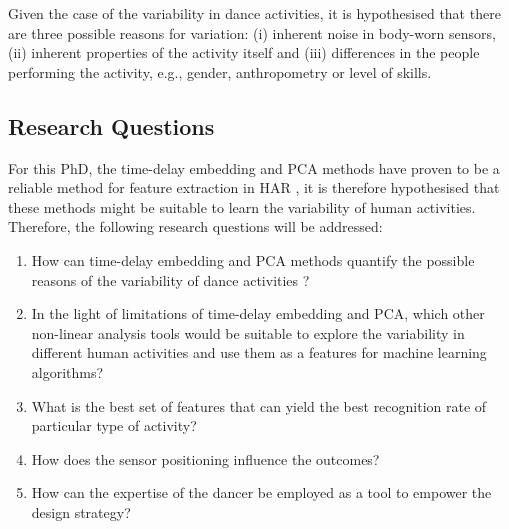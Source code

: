 \documentclass[10pt,journal,compsoc]{IEEEtran}
\begin{document}
Given the case of the variability in dance activities, it is hypothesised that 
there are three possible reasons for variation:
(i) inherent noise in body-worn sensors, 
(ii) inherent properties of the activity itself and
(iii) differences in the people performing the activity,
e.g., gender, anthropometry or level of skills.

\subsection{Research Questions}

For this PhD, the time-delay embedding and PCA methods 
have proven to be a reliable method
for feature extraction in HAR \cite{Frank2010, Gouwanda2012, Sama2013},
it is therefore hypothesised that these methods might be suitable 
to learn the variability of human activities.
Therefore, the following research questions will be addressed:
\begin{enumerate}
 \item How can time-delay embedding and PCA methods 
 quantify the possible reasons of 
 the variability of dance activities ?
 \item In the light of limitations of time-delay embedding and PCA,
 which other non-linear analysis tools would be suitable to explore 
 the variability in different human activities and use them as a features 
 for machine learning algorithms?
 
 \item What is the best set of features that can yield the best 
 recognition rate of particular type of activity? 
 
 \item How does the sensor positioning influence the outcomes? 
 
 \item How can the expertise of the dancer be employed as a tool 
 to empower the design strategy? 
 
 
\end{enumerate}
\end{document}
